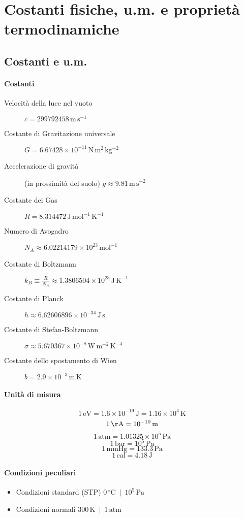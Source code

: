 \documentclass[10pt, oneside]{article}
\begin{document}
\section{Costanti fisiche, u.m. e proprietà termodinamiche}
\subsection*{Costanti e u.m.}
\paragraph{Costanti}
\begin{description}
\item[Velocità della luce nel vuoto] $\displaystyle c = 299792458 \, \mathrm{m \, s^{-1}}$
\item[Costante di Gravitazione universale] $\displaystyle G = 6.67428 \times 10^{-11} \, \mathrm{N \, m^2 \, kg^{-2}}$
\item[Accelerazione di gravità] (in prossimità del suolo) $\displaystyle g \approx 9.81 \, \mathrm{m \, s^{-2}}$
\item[Costante dei Gas] $\displaystyle R = 8.314472 \, \mathrm{J \, mol^{-1} \, K^{-1}}$
\item[Numero di Avogadro] $\displaystyle N_A \approx 6.02214179 \times 10^{23} \, \mathrm{mol^{-1}}$
\item[Costante di Boltzmann] $\displaystyle k_B \equiv \frac{R}{N_A} \approx 1.3806504 \times 10^{23} \, \mathrm{J \, K^{-1}}$ 
\item[Costante di Planck] $\displaystyle h \approx 6.62606896 \times 10^{-34} \, \mathrm{J \, s}$
\item[Costante di Stefan-Boltzmann] $\displaystyle \sigma \approx 5.670367 \times 10^{-8} \, \mathrm{W \, m^{-2} \, K^{-4}}$
\item[Costante dello spostamento di Wien] $\displaystyle b = 2.9 \times 10^{-3} \, \mathrm{m \, K}$
\end{description}
\paragraph{Unità di misura}
\[1 \, \mathrm{eV} = 1.6 \times 10^{-19} \, \mathrm{J} = 1.16 \times 10^{4} \, \mathrm{K}\]
\[1 \, \mathrm{\AA} = 10^{-10} \, \mathrm{m}\]
\[1 \, \mathrm{atm} = 1.01325 \times 10^{5} \, \mathrm{Pa}\]
\[1 \, \mathrm{bar} = 10^{5} \, \mathrm{Pa}\]
\[1 \, \mathrm{mmHg} = 133.3 \, \mathrm{Pa}\]
\[1 \, \mathrm{cal} = 4.18 \, \mathrm{J}\]

\paragraph{Condizioni peculiari}
\begin{itemize}
\item Condizioni standard (STP) \dotfill $ 0 \, \mathrm{{}^\circ C} \enspace \big| \enspace 10^5 \, \mathrm{Pa}$
\item Condizioni normali \dotfill $ 300 \, \mathrm{K} \enspace \big| \enspace 1 \, \mathrm{atm}$

\end{itemize}
\end{document}
